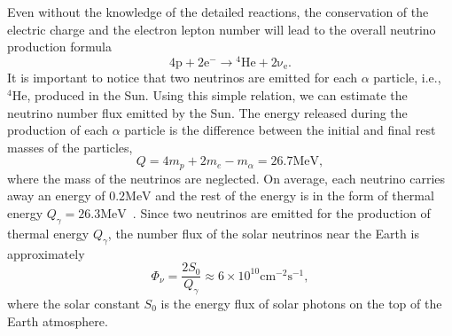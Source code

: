 Even without the knowledge of the detailed reactions, the conservation of the electric charge and the electron lepton number will lead to the overall neutrino production formula
\begin{equation}
\mathrm{4p+2e^- \to {}^4He + 2\nu_e }.
\end{equation}
It is important to notice that two neutrinos are emitted for each $\alpha$ particle, i.e., ${}^4\mathrm{He}$, produced in the Sun. Using this simple relation, we can estimate the neutrino number flux emitted by the Sun. The energy released during the production of each $\alpha$ particle is the difference between the initial and final rest masses of the particles,
\begin{equation}
Q=4m_p+2m_e-m_{\alpha}=26.7\mathrm{MeV},
\end{equation}
where the mass of the neutrinos are neglected. On average, each neutrino carries away an energy of $0.2\mathrm{MeV}$ and the rest of the energy is in the form of thermal energy $Q_\gamma=26.3\mathrm{MeV}$~\cite{Adelberger2011a}. %
Since two neutrinos are emitted for the production of thermal energy $Q_\gamma$, the number flux of the solar neutrinos near the Earth is approximately
\begin{equation}
\Phi_\nu = \frac{2 S_0}{Q_\gamma} \approx 6\times 10^{10} \mathrm{cm^{-2}s^{-1}},
\end{equation}
where the solar constant $S_0$ is the energy flux of solar photons on the top of the Earth atmosphere.



